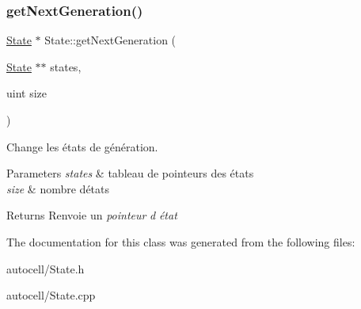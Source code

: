 \subsubsection{\texorpdfstring{get\+Next\+Generation()}{getNextGeneration()}}
{\footnotesize\ttfamily \mbox{\hyperlink{class_state}{State}} $\ast$ State\+::get\+Next\+Generation (\begin{DoxyParamCaption}\item[{\mbox{\hyperlink{class_state}{State}} $\ast$$\ast$}]{states,  }\item[{uint}]{size }\end{DoxyParamCaption})}



Change les états de génération. 


\begin{DoxyParams}{Parameters}
{\em states} & tableau de pointeurs des états \\
\hline
{\em size} & nombre d\textquotesingle{}états \\
\hline
\end{DoxyParams}
\begin{DoxyReturn}{Returns}
Renvoie un {\itshape pointeur} {\itshape d\textquotesingle{}} {\itshape état} 
\end{DoxyReturn}


The documentation for this class was generated from the following files\+:\begin{DoxyCompactItemize}
\item 
autocell/State.\+h\item 
autocell/State.\+cpp\end{DoxyCompactItemize}
